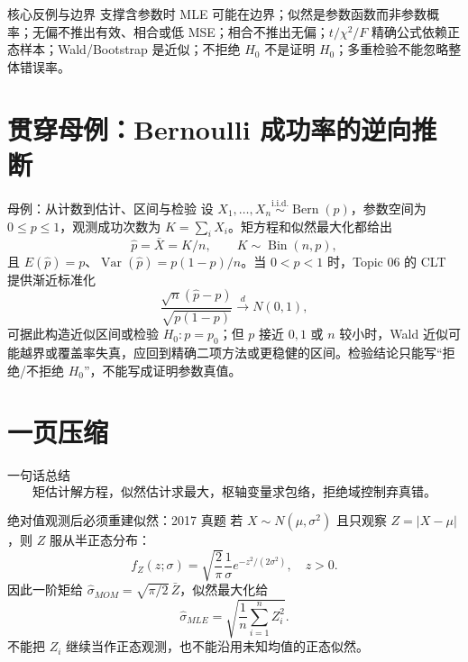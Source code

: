 \documentclass[11pt,a4paper]{ctexart}
\begin{document}
\begin{warnbox}{核心反例与边界}
支撑含参数时 MLE 可能在边界；似然是参数函数而非参数概率；无偏不推出有效、相合或低 MSE；相合不推出无偏；$t/\chi^2/F$ 精确公式依赖正态样本；Wald/Bootstrap 是近似；不拒绝 $H_0$ 不是证明 $H_0$；多重检验不能忽略整体错误率。
\end{warnbox}

\section{贯穿母例：Bernoulli 成功率的逆向推断}

\begin{examplebox}{母例：从计数到估计、区间与检验}
设 $X_1,\ldots,X_n\overset{\mathrm{i.i.d.}}\sim\operatorname{Bern}(p)$，参数空间为 $0\le p\le1$，观测成功次数为 $K=\sum_iX_i$。矩方程和似然最大化都给出
\[
\widehat p=\bar X=K/n,\qquad K\sim\operatorname{Bin}(n,p),
\]
且 $E(\widehat p)=p$、$\operatorname{Var}(\widehat p)=p(1-p)/n$。当 $0<p<1$ 时，Topic 06 的 CLT 提供渐近标准化
\[
\frac{\sqrt n(\widehat p-p)}{\sqrt{p(1-p)}}\xrightarrow{d}N(0,1),
\]
可据此构造近似区间或检验 $H_0:p=p_0$；但 $p$ 接近 $0,1$ 或 $n$ 较小时，Wald 近似可能越界或覆盖率失真，应回到精确二项方法或更稳健的区间。检验结论只能写“拒绝/不拒绝 $H_0$”，不能写成证明参数真值。
\end{examplebox}

\section{一页压缩}

\begin{corebox}{一句话总结}
\[
\boxed{\text{矩估计解方程，似然估计求最大，枢轴变量求包络，拒绝域控制弃真错。}}
\]
\end{corebox}

\begin{examplebox}{绝对值观测后必须重建似然：2017 真题}
若 $X\sim N(\mu,\sigma^2)$ 且只观察 $Z=\lvert X-\mu\rvert$，则 $Z$ 服从半正态分布：
\[
f_Z(z;\sigma)=\sqrt{\frac2\pi}\frac1\sigma e^{-z^2/(2\sigma^2)},\quad z>0.
\]
因此一阶矩给 $\widehat\sigma_{MOM}=\sqrt{\pi/2}\,\bar Z$，似然最大化给
\[
\widehat\sigma_{MLE}=\sqrt{\frac1n\sum_{i=1}^nZ_i^2}.
\]
不能把 $Z_i$ 继续当作正态观测，也不能沿用未知均值的正态似然。
\end{examplebox}
\end{document}
